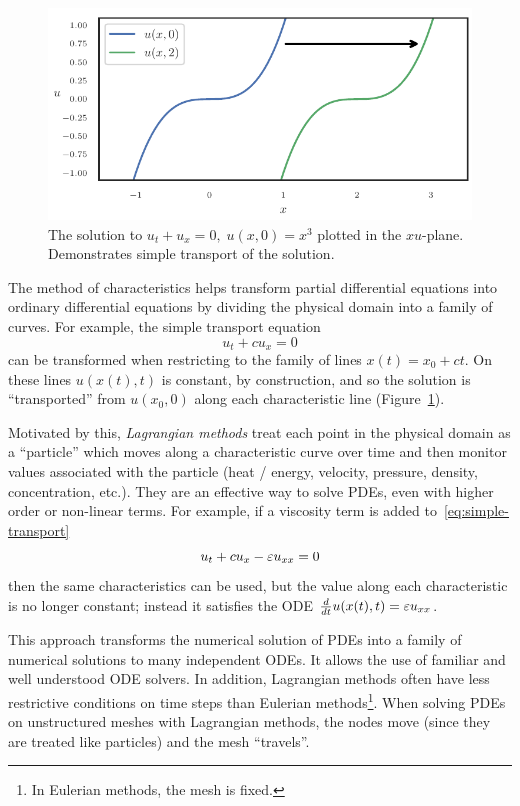 \begin{figure}
  \includegraphics{../images/solution-transfer/simple_transport.pdf}
  \centering
  \captionsetup{width=.75\linewidth}
  \caption{The solution to \(u_t + u_x = 0, \; u(x, 0) = x^3\) plotted in
    the \(xu\)-plane. Demonstrates simple transport of
    the solution.}
  \label{fig:simple-transport}
\end{figure}

The method of characteristics helps transform partial differential equations
into ordinary differential equations by dividing the physical domain into
a family of curves. For example, the simple transport equation
\begin{equation}\label{eq:simple-transport}
u_t + c u_x = 0
\end{equation}
can be transformed when restricting to the family of lines
\(x(t) = x_0 + c t\). On these lines \(u(x(t), t)\) is constant, by
construction, and so the solution is ``transported'' from \(u(x_0, 0)\)
along each characteristic line (Figure~\ref{fig:simple-transport}).

Motivated by this, \emph{Lagrangian methods} treat each point in the
physical domain as a ``particle'' which moves along a characteristic curve
over time and then monitor values associated with the particle (heat / energy,
velocity, pressure, density, concentration, etc.). They are an effective way
to solve PDEs, even with higher order or non-linear terms.
For example, if a viscosity term is added to~\eqref{eq:simple-transport}
\begin{equation}
u_t + c u_x - \varepsilon u_{xx} = 0
\end{equation}
then the same characteristics can be used, but the value
along each characteristic is no longer constant; instead it satisfies the
ODE \(\frac{d}{dt} u(x(t), t) = \varepsilon u_{xx}\).

This approach transforms the numerical solution of PDEs into a family of
numerical solutions to many independent ODEs. It allows the use of familiar
and well understood ODE solvers. In addition, Lagrangian methods often
have less restrictive conditions on time steps than Eulerian
methods\footnote{In Eulerian methods, the mesh is fixed.}.
When solving PDEs on unstructured meshes
with Lagrangian methods, the nodes move (since they
are treated like particles) and the mesh ``travels''.

